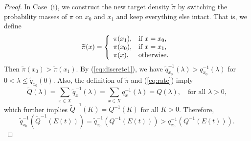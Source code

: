 \documentclass[10pt,a4paper]{amsart}
\begin{document}
\begin{proof}
In Case~(i), we construct the new target density $\widetilde{\pi}$ by switching the probability masses of $\pi$ on $x_0$ and $x_1$ and keep everything else intact. That is, we define
\[ \widetilde{\pi}(x)=\left\{
		                           \begin{array}{ll}
		                           \pi(x_1),& \hbox{if $x=x_0$,} \\
					\pi(x_0), & \hbox{if $x=x_1$,} \\
					\pi(x), & \hbox{otherwise.}
		                          \end{array}
		                         \right.		                         
		                         \]
Then $\widetilde{\pi}(x_0)>\widetilde{\pi}(x_1)$.  By (\ref{eq:discrete1}), we have $\widetilde{q}^{-1}_{x_0}(\lambda)>q^{-1}_{x_0}(\lambda)$ for $0<\lambda\leq \widetilde{q}_{x_0}(0)$.  Also,   the definition of $\widetilde{\pi}$ and (\ref{eq:rate}) imply 
\[\widetilde{Q}(\lambda)=\sum_{x\in X}\widetilde{q}_x^{-1}(\lambda)=\sum_{x\in X}q_x^{-1}(\lambda)=Q(\lambda), \quad \text{for all $\lambda>0$},\]
which further implies $\widetilde{Q}^{-1}(K)=Q^{-1}(K)$ for all  $K>0$. Therefore, 
\[\widetilde{q}^{-1}_{x_0}(\widetilde{Q}^{-1}(E(t)))=\widetilde{q}^{-1}_{x_0}(Q^{-1}(E(t)))>q_{x_0}^{-1}(Q^{-1}(E(t))).\]


\end{proof}
\end{document}

